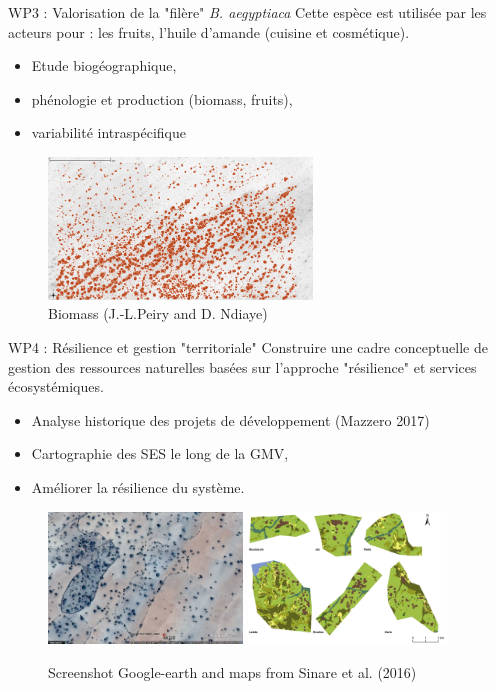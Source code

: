 \documentclass[newPxFont]{beamer}
\begin{document}
\begin{frame}[c]{WP3 : Valorisation de la "filère" \textit{B. aegyptiaca}}
\vspace{-2em}
Cette espèce est utilisée par les acteurs pour  : les fruits, l'huile d'amande (cuisine et cosmétique).
\begin{itemize}
  \item Etude biogéographique,
  \item phénologie et production (biomass, fruits),
  \item variabilité intraspécifique
\end{itemize}
\vspace{-1em}
\begin{figure}
	\centering
	\includegraphics[width = 7cm]{img/Biomasse_arboree}
  \vspace{-1em}
  \caption{Biomass (J.-L.Peiry and D. Ndiaye)}
\end{figure}
\end{frame}

\begin{frame}[c]{WP4 : Résilience et gestion "territoriale"}
\vspace{-2em}
Construire une cadre conceptuelle de gestion des ressources naturelles basées sur l'approche "résilience" et services écosystémiques.
\begin{itemize}
  \item Analyse historique des projets de développement (Mazzero 2017)
  \item Cartographie des SES le long de la GMV,
  \item Améliorer la résilience du système.
\end{itemize}
\begin{figure}
	\centering
	\includegraphics[height = 3.5cm]{img/ggearth}
  \includegraphics[height = 3.5cm]{img/Sinare_et_al2016}
  \caption{\small{Screenshot Google-earth and maps from Sinare et al. (2016)}}
\end{figure}
\end{frame}
\end{document}
